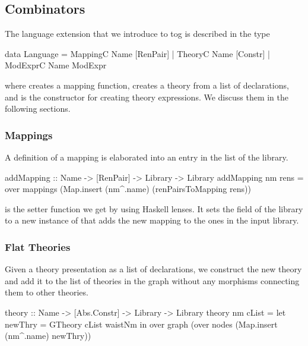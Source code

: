 \subsection{Combinators}
\label{subsec:combinatorsImpl}
The language extension that we introduce to tog is described in the type  
\begin{togcode}
data Language = 
    MappingC Name [RenPair]
  | TheoryC Name [Constr]
  | ModExprC Name ModExpr
\end{togcode}
where  creates a mapping function,  creates a theory from a list of declarations, and  is the constructor for creating theory expressions. We discuss them in the following sections. 


\subsubsection{Mappings}
A definition of a mapping is elaborated into an entry in the  list of the library. 
\begin{hscode}
addMapping :: Name -> [RenPair] -> Library -> Library
addMapping nm rens = 
   over mappings (Map.insert (nm^.name) (renPairsToMapping rens))
\end{hscode}
 is the setter function we get by using Haskell lenses. It sets the  field of the library to a new instance of  that adds the new mapping to the ones in the input library. 

\subsubsection{Flat Theories}
Given a theory presentation as a list of declarations, we construct the new theory and add it to the list of theories in the graph without any morphisms connecting them to other theories. 
\begin{hscode}
theory :: Name -> [Abs.Constr] -> Library -> Library
theory nm cList =
  let newThry  = GTheory cList waistNm
  in  over graph (over nodes (Map.insert (nm^.name) newThry))
\end{hscode}


